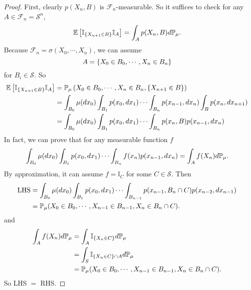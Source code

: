 \begin{proof}
    First, clearly $p(X_n, B)$ is $\mathcal{F}_n$-measurable. So it suffices to check for any $A \in \mathcal{F}_n = \mathcal{S}^n$,
    \begin{equation*}
        \mathbb{E}\left[\mathbb{I}_{\left\{X_{n+1} \in B\right\}} \mathbb{I}_A\right] = \int_A p(X_n, B) d\mathbb{P}_\mu.
    \end{equation*}
    Because $\mathcal{F}_n = \sigma(X_0, \cdots, X_n)$, we can assume
    \begin{equation*}
        A = \left\{X_0 \in B_0,\cdots,X_n \in B_n\right\}
    \end{equation*}
    for $B_i \in \mathcal{S}$. So
    \begin{equation*}
        \begin{aligned}
            \mathbb{E}\left[\mathbb{I}_{\left\{X_{n+1} \in B\right\}} \mathbb{I}_A\right] &= \mathbb{P}_\mu\left(X_0 \in B_0,\cdots,X_n \in B_n,\left\{X_{n+1} \in B\right\}\right) \\
            &= \int_{B_0} \mu(dx_0)\int_{B_1}p(x_0, dx_1)\cdots \int_{B_n}p(x_{n-1},dx_n)\int_Bp(x_n,dx_{n+1}) \\
            &=\int_{B_0} \mu(dx_0)\int_{B_1}p(x_0, dx_1)\cdots \int_{B_n}p(x_n,B)p(x_{n-1},dx_n)
        \end{aligned}
    \end{equation*}
    In fact, we can prove that for any measurable function $f$
    \begin{equation*}
        \int_{B_0} \mu(dx_0)\int_{B_1}p(x_0, dx_1)\cdots \int_{B_n}f(x_n)p(x_{n-1},dx_n) = \int_A f(X_n)d\mathbb{P}_\mu.
    \end{equation*}
    By approximation, it can assume $f = \mathbb{I}_C$ for some $C \in \mathcal{S}$. Then
    \begin{equation*}
        \begin{aligned}
            \text{LHS} &= \int_{B_0} \mu(dx_0)\int_{B_1}p(x_0, dx_1)\cdots \int_{B_{n-1}}p(x_{n-1},B_n \cap C)p(x_{n-2},dx_{n-1}) \\
            &= \mathbb{P}_\mu(X_0 \in B_0,\cdots,X_{n-1} \in B_{n-1},X_n \in B_n \cap C).
        \end{aligned}
    \end{equation*}
    and
    \begin{equation*}
        \begin{aligned}
            \int_A f(X_n)d\mathbb{P}_\mu &= \int_A \mathbb{I}_{\left\{X_n \in C\right\}}d\mathbb{P}_\mu \\
            &= \int_S \mathbb{I}_{\left\{X_n \in C\right\} \cap A} d\mathbb{P}_\mu \\
            &= \mathbb{P}_\mu(X_0 \in B_0,\cdots,X_{n-1} \in B_{n-1},X_n \in B_n \cap C).
        \end{aligned}
    \end{equation*}
    So LHS $=$ RHS. \qedhere
\end{proof}


